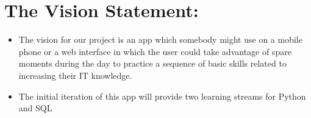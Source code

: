 \section{The Vision Statement:}


\begin{itemize}


    \item The vision for our project is an app which somebody might use on a mobile phone or a web interface in which the user could take advantage of spare moments during the day to practice a sequence of basic skills related to increasing their IT knowledge.

    \item The initial iteration of this app will provide two learning streams for Python and SQL

\end{itemize}